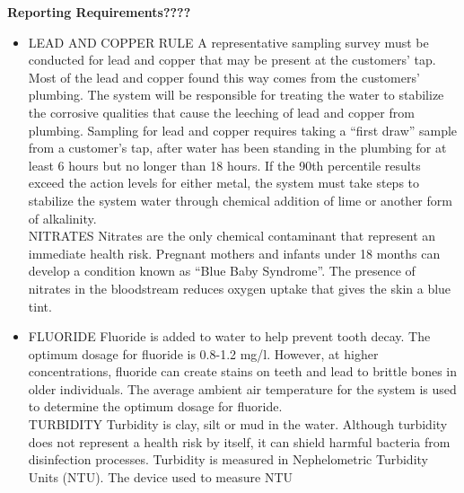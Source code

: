 \textbf{Reporting Requirements????}\\
\begin{itemize}
\item LEAD AND COPPER RULE A representative sampling survey must be conducted for lead and copper that may be present at the customers’ tap. Most of the lead and copper found this way comes from the customers’ plumbing. The system will be responsible for treating the water to stabilize the corrosive qualities that cause the leeching of lead and copper from plumbing. Sampling for lead and copper requires taking a “first draw” sample from a customer’s tap, after water has been standing in the plumbing for at least 6 hours but no longer than 18 hours. If the 90th percentile results exceed the action levels for either metal, the system must take steps to stabilize the system water through chemical addition of lime or another form of alkalinity.\\
NITRATES Nitrates are the only chemical contaminant that represent an immediate health risk. Pregnant mothers and infants under 18 months can develop a condition known as “Blue Baby Syndrome”. The presence of nitrates in the bloodstream reduces oxygen uptake that gives the skin a blue tint.\\

\item FLUORIDE Fluoride is added to water to help prevent tooth decay. The optimum dosage for fluoride is 0.8-1.2 mg/l. However, at higher concentrations, fluoride can create stains on teeth and lead to brittle bones in older individuals. The average ambient air temperature for the system is used to determine the optimum dosage for fluoride. \\
TURBIDITY Turbidity is clay, silt or mud in the water. Although turbidity does not represent a health risk by itself, it can shield harmful bacteria from disinfection processes. Turbidity is measured in Nephelometric Turbidity Units (NTU). The device used to measure NTU\\


\end{itemize}
